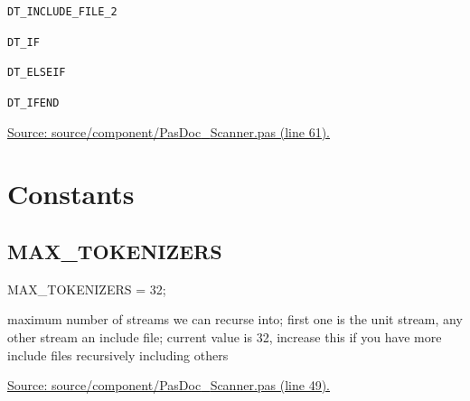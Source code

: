 \documentclass{report}
\newif\ifpdf
\begin{document}
\begin{list}{}
\begin{description}
\item[\texttt{DT{\_}INCLUDE{\_}FILE{\_}2}] \label{PasDoc_Scanner-DT_INCLUDE_FILE_2}
\index{}
 
\item[\texttt{DT{\_}IF}] \label{PasDoc_Scanner-DT_IF}
\index{}
 
\item[\texttt{DT{\_}ELSEIF}] \label{PasDoc_Scanner-DT_ELSEIF}
\index{}
 
\item[\texttt{DT{\_}IFEND}] \label{PasDoc_Scanner-DT_IFEND}
\index{}
 
\end{description}
\par
\href{https://github.com/pasdoc/pasdoc/blob/master/source/component/PasDoc_Scanner.pas#L61}{Source: source/component/PasDoc{\_}Scanner.pas (line 61).}

\end{list}
\section{Constants}
\ifpdf
\subsection*{\large{\textbf{MAX{\_}TOKENIZERS}}\normalsize\hspace{1ex}\hrulefill}
\else
\subsection*{MAX{\_}TOKENIZERS}
\fi
\label{PasDoc_Scanner-MAX_TOKENIZERS}
\begin{list}{}{
\setlength{\itemindent}{0cm}
\setlength{\listparindent}{0cm}
\setlength{\leftmargin}{\evensidemargin}
\addtolength{\leftmargin}{\tmplength}
\settowidth{\labelsep}{X}
\addtolength{\leftmargin}{\labelsep}
\setlength{\labelwidth}{\tmplength}
}
\item[\textbf{Declaration}\hfill]
\ifpdf
\begin{flushleft}
\fi
\begin{ttfamily}
MAX{\_}TOKENIZERS = 32;\end{ttfamily}

\ifpdf
\end{flushleft}
\fi

\par
\item[\textbf{Description}]
maximum number of streams we can recurse into; first one is the unit stream, any other stream an include file; current value is 32, increase this if you have more include files recursively including others\par
\href{https://github.com/pasdoc/pasdoc/blob/master/source/component/PasDoc_Scanner.pas#L49}{Source: source/component/PasDoc{\_}Scanner.pas (line 49).}

\end{list}
\end{document}
